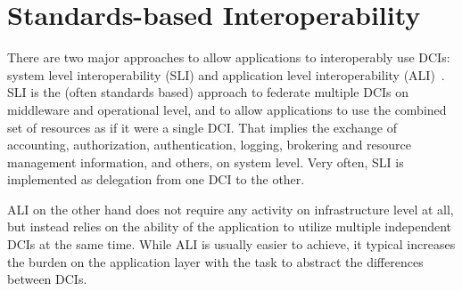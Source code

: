 \documentclass[]{paper}
\newcommand{\jhanote}[1]{ {\textcolor{red} { ***shantenu: #1 }}}
\newcommand{\alnote}[1]{ {\textcolor{green} { ***andreL: #1 }}}
\newcommand{\alnote}[1]{}
\newcommand{\jhanote}[1]{}
\begin{document}
% 
% 

\section{Standards-based Interoperability}
\label{sec:standards}

There are two major approaches to allow applications to interoperably
use DCIs: system level interoperability (SLI) and application level
interoperability (ALI)~\cite{fgcs-interop11}.  SLI is the (often
standards based) approach to federate multiple DCIs on middleware and
operational level, and to allow applications to use the combined set
of resources as if it were a single DCI.  That implies the exchange of
accounting, authorization, authentication, logging, brokering and
resource management information, and others, on system level.  Very
often, SLI is implemented as delegation from one DCI to the other.

ALI on the other hand does not require any activity on infrastructure
level at all, but instead relies on the ability of the application to
utilize multiple independent DCIs at the same time.  While ALI is
usually easier to achieve, it typical increases the burden on the
application layer with the task to abstract the differences between
DCIs.

\end{document}
